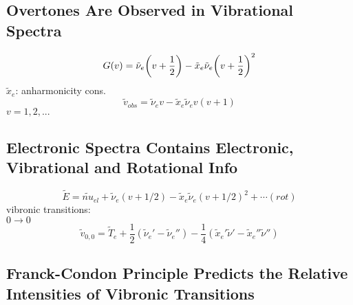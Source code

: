 \documentclass[a4paper]{article}
\DeclareMathOperator{\ra}{\rightarrow}
\numberwithin{equation}{section}
\begin{document}
\subsection{Overtones Are Observed in Vibrational Spectra}
\begin{equation}\label{key}
G(v) = \tilde\nu_e \qty(v + \dfrac{1}{2}) - \tilde{x}_e\tilde{\nu}_e\qty(v + \dfrac{1}{2})^2
\end{equation}
$ \tilde{x}_e $: anharmonicity cons.\\
\begin{equation}\label{key}
 \tilde{v}_{obs} = \tilde{\nu}_e v - \tilde{x}_e\tilde{\nu}_e v(v+1) 
\end{equation}
$ v = 1,2,... $

\subsection{Electronic Spectra Contains Electronic, Vibrational and Rotational Info}
\begin{equation}\label{key}
\tilde{E} = \tilde{nu}_{el} + \tilde{\nu}_e(v +1/2) - \tilde{x}_e\tilde{\nu}_e(v + 1/2)^2 + \cdots(rot)
\end{equation}
vibronic transitions:\\
$ 0\ra 0 $
\begin{equation}\label{key}
\tilde{v}_{0,0} = \tilde{T}_e + \dfrac{1}{2}(\tilde{\nu}_e' - \tilde{\nu}_e'') - \dfrac{1}{4}(\tilde{x}_e'\tilde{\nu}' - \tilde{x}_e''\tilde{\nu}'')
\end{equation}

\subsection{Franck-Condon Principle Predicts the Relative Intensities of Vibronic Transitions}
\end{document}

